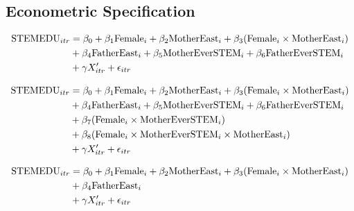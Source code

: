 \documentclass[a4paper, oneside, hyperfootnotes = false]{article}
\begin{document}
{\subsection{Econometric Specification}
\label{specification}

\begin{align}
	\begin{split}
		\label{eq:spec6}
		\textnormal{STEMEDU}_{itr} &={} \beta_{0} + \beta_{1} \textnormal{Female}_{i} + \beta_{2}\textnormal{MotherEast}_{i} + \beta_{3}(\textnormal{Female}_{i} \times \textnormal{MotherEast}_{i}) \\
		& + \beta_{4}\textnormal{FatherEast}_{i} + \beta_{5}\textnormal{MotherEverSTEM}_{i} + \beta_{6}\textnormal{FatherEverSTEM}_{i} \\
		& + \gamma{}X'_{itr} + \epsilon_{itr}
	\end{split}
\end{align}

\begin{equation}
	\begin{split}
		\label{eq:spec8}
		\textnormal{STEMEDU}_{itr} &={} \beta_{0} + \beta_{1} \textnormal{Female}_{i} + \beta_{2}\textnormal{MotherEast}_{i} + \beta_{3}(\textnormal{Female}_{i} \times \textnormal{MotherEast}_{i}) \\
		& + \beta_{4}\textnormal{FatherEast}_{i} + \beta_{5}\textnormal{MotherEverSTEM}_{i} + \beta_{6}\textnormal{FatherEverSTEM}_{i} \\
		& + \beta_{7}(\textnormal{Female}_{i} \times \textnormal{MotherEverSTEM}_{i}) \\
		& + \beta_{8}(\textnormal{Female}_{i} \times \textnormal{MotherEverSTEM}_{i} \times \textnormal{MotherEast}_{i}) \\
		& + \gamma{}X'_{itr} + \epsilon_{itr}
	\end{split}
\end{equation}

\begin{equation}
		\begin{split}
		\label{eq:spec4}
		\textnormal{STEMEDU}_{itr} &={} \beta_{0} + \beta_{1} \textnormal{Female}_{i} + \beta_{2}\textnormal{MotherEast}_{i} + \beta_{3}(\textnormal{Female}_{i} \times \textnormal{MotherEast}_{i}) \\
		& + \beta_{4}\textnormal{FatherEast}_{i} \\
		& + \gamma{}X'_{itr} + \epsilon_{itr}
	\end{split}
\end{equation}

}
\end{document}
